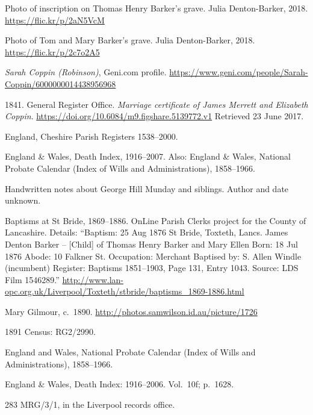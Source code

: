 \begin{thebibliography}{99}
\footnotesize

	Photo of inscription on Thomas Henry Barker's grave. Julia Denton-Barker, 2018.
	\url{https://flic.kr/p/2aN5VcM}

	Photo of Tom and Mary Barker's grave. Julia Denton-Barker, 2018.
	\url{https://flic.kr/p/2c7o2A5}

	\emph{Sarah Coppin (Robinson)}, Geni.com profile.
	\url{https://www.geni.com/people/Sarah-Coppin/6000000014438956968}

	1841. General Register Office. \emph{Marriage certificate of James Merrett and Elizabeth Coppin}.
	\url{https://doi.org/10.6084/m9.figshare.5139772.v1}
	Retrieved 23 June 2017.

	England, Cheshire Parish Registers 1538--2000.

	England \& Wales, Death Index, 1916--2007.
	Also: England \& Wales, National Probate Calendar (Index of Wills and Administrations), 1858--1966.

	Handwritten notes about George Hill Munday and siblings. Author and date unknown.

	Baptisms at St Bride, 1869--1886. OnLine Parish Clerks project for the County of Lancashire.
	Details: ``Baptism: 25 Aug 1876 St Bride, Toxteth, Lancs.
	James Denton Barker -- [Child] of Thomas Henry Barker and Mary Ellen
	Born: 18 Jul 1876
	Abode: 10 Falkner St.
	Occupation: Merchant
	Baptised by: S. Allen Windle (incumbent)
	Register: Baptisms 1851--1903, Page 131, Entry 1043.
	Source: LDS Film 1546289.''
	\url{http://www.lan-opc.org.uk/Liverpool/Toxteth/stbride/baptisms_1869-1886.html}

	Mary Gilmour, c.~1890.
	\url{http://photos.samwilson.id.au/picture/1726}

	1891 Census: RG2/2990.

	England and Wales, National Probate Calendar (Index of Wills and Administrations), 1858--1966.

	England \& Wales, Death Index: 1916--2006. Vol.~10f; p.~1628.

	283 MRG/3/1, in the Liverpool records office.


\end{thebibliography}
